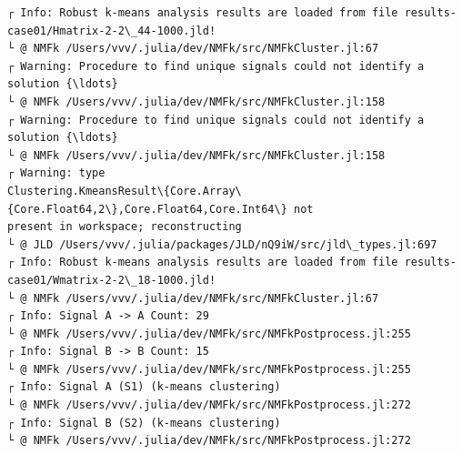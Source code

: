 \documentclass[11pt]{article}
\begin{document}
    \begin{Verbatim}[commandchars=\\\{\}]
┌ Info: Robust k-means analysis results are loaded from file results-
case01/Hmatrix-2-2\_44-1000.jld!
└ @ NMFk /Users/vvv/.julia/dev/NMFk/src/NMFkCluster.jl:67
┌ Warning: Procedure to find unique signals could not identify a solution {\ldots}
└ @ NMFk /Users/vvv/.julia/dev/NMFk/src/NMFkCluster.jl:158
┌ Warning: Procedure to find unique signals could not identify a solution {\ldots}
└ @ NMFk /Users/vvv/.julia/dev/NMFk/src/NMFkCluster.jl:158
┌ Warning: type
Clustering.KmeansResult\{Core.Array\{Core.Float64,2\},Core.Float64,Core.Int64\} not
present in workspace; reconstructing
└ @ JLD /Users/vvv/.julia/packages/JLD/nQ9iW/src/jld\_types.jl:697
┌ Info: Robust k-means analysis results are loaded from file results-
case01/Wmatrix-2-2\_18-1000.jld!
└ @ NMFk /Users/vvv/.julia/dev/NMFk/src/NMFkCluster.jl:67
┌ Info: Signal A -> A Count: 29
└ @ NMFk /Users/vvv/.julia/dev/NMFk/src/NMFkPostprocess.jl:255
┌ Info: Signal B -> B Count: 15
└ @ NMFk /Users/vvv/.julia/dev/NMFk/src/NMFkPostprocess.jl:255
┌ Info: Signal A (S1) (k-means clustering)
└ @ NMFk /Users/vvv/.julia/dev/NMFk/src/NMFkPostprocess.jl:272
┌ Info: Signal B (S2) (k-means clustering)
└ @ NMFk /Users/vvv/.julia/dev/NMFk/src/NMFkPostprocess.jl:272
    \end{Verbatim}

    \begin{center}
    \end{center}
    { \hspace*{\fill} \\}
    
    \begin{Verbatim}[commandchars=\\\{\}]

    \end{Verbatim}

    \begin{center}
    \end{center}
    { \hspace*{\fill} \\}
    
    \begin{center}
    \end{center}
    { \hspace*{\fill} \\}
    
\end{document}
